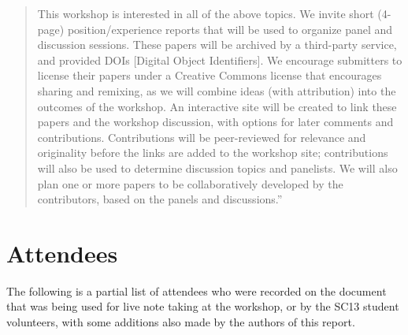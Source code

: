 \documentclass[11pt, oneside]{amsart}
\newcommand{\note}[1]{ {\textcolor{red}    { #1 }}}
\begin{document}
\begin{quote}
This workshop is interested in all of the above topics.  We invite short (4-page) position/experience reports that will be used
to organize panel and discussion sessions. These papers will be
archived by a third-party service, and provided DOIs [Digital Object Identifiers].
We encourage
submitters to license their papers under a Creative Commons license
that encourages sharing and remixing, as we will combine ideas (with
attribution) into the outcomes of the workshop.  An interactive site
will be created to link these papers and the workshop discussion, with
options for later comments and contributions. Contributions will be
peer-reviewed for relevance and originality before the links are added
to the workshop site; contributions will also be used to determine
discussion topics and panelists. We will also plan one or more papers
to be collaboratively developed by the contributors, based on the
panels and discussions.''
\end{quote}

\section{Attendees} \label{sec:attendees}  %


The following is a partial list of attendees who were recorded on the
document~\cite{WSSSPE1-google-notes} that was being used for live note taking at the workshop, or by the SC13 student volunteers, with some additions also made by the authors of this report.
\end{document}
